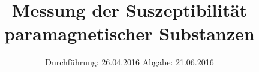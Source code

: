 

\subject{V606 Korrektur}
\title{Messung der Suszeptibilität paramagnetischer Substanzen}
\date{
  Durchführung: 26.04.2016
  \hspace{3em}
  Abgabe: 21.06.2016
}



\maketitle
\thispagestyle{empty}
\tableofcontents
\newpage







\printbibliography


